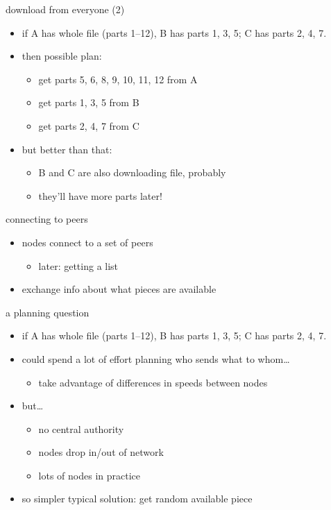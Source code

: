 \begin{frame}{download from everyone (2)}
    \begin{itemize}
    \item if A has whole file (parts 1--12), B has parts 1, 3, 5; C has parts 2, 4, 7.
    \vspace{.5cm}
    \item then possible plan:
        \begin{itemize}
        \item get parts 5, 6, 8, 9, 10, 11, 12 from A
        \item get parts 1, 3, 5 from B
        \item get parts 2, 4, 7 from C
        \end{itemize}
    \item but better than that:
        \begin{itemize}
        \item B and C are also downloading file, probably
        \item they'll have more parts later!
        \end{itemize}
    \end{itemize}
\end{frame}

\begin{frame}{connecting to peers}
    \begin{itemize}
    \item nodes connect to a set of peers
        \begin{itemize}
        \item later: getting a list
        \end{itemize}
    \item exchange info about what pieces are available
    \end{itemize}
\end{frame}

\begin{frame}{a planning question}
    \begin{itemize}
    \item if A has whole file (parts 1--12), B has parts 1, 3, 5; C has parts 2, 4, 7.
    \vspace{.5cm}
    \item could spend a lot of effort planning who sends what to whom\ldots
        \begin{itemize}
        \item take advantage of differences in speeds between nodes
        \end{itemize}
    \item but\ldots
        \begin{itemize}
        \item no central authority
        \item nodes drop in/out of network
        \item lots of nodes in practice
        \end{itemize}
    \item so simpler typical solution: get random available piece
    \end{itemize}
\end{frame}

